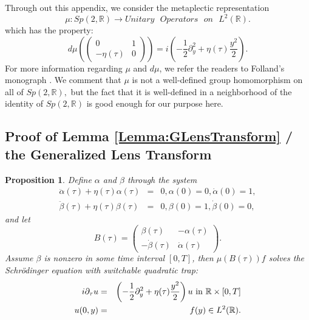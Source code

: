 \documentclass[reqno]{amsart}
\theoremstyle{plain}
\newtheorem{proposition}{Proposition}
\numberwithin{equation}{section}
\begin{document}
Through out this appendix, we consider the metaplectic representation\begin{equation*}
\mu :Sp\left( 2,\mathbb{R}\right) \rightarrow Unitary\text{ }Operators\text{ 
}on\text{ }L^{2}(\mathbb{R}).
\end{equation*}which has the property:\begin{equation*}
d\mu \left( 
\begin{pmatrix}
0 & 1 \\ 
-\eta (\tau ) & 0\end{pmatrix}\right) =i\left( -\frac{1}{2}\partial _{y}^{2}+\eta (\tau )\frac{y^{2}}{2}\right) .
\end{equation*}For more information regarding $\mu $ and $d\mu $, we refer the readers to
Folland's monograph \cite{Folland}. We comment that $\mu $ is not a
well-defined group homomorphism on all of $Sp\left( 2,\mathbb{R}\right) ,$
but the fact that it is well-defined in a neighborhood of the identity of $Sp\left( 2,\mathbb{R}\right) $ is good enough for our purpose here.

\subsection{Proof of Lemma \protect\ref{Lemma:GLensTransform} / the
Generalized Lens Transform}

\begin{proposition}
Define $\alpha $ and $\beta $ through the system\begin{eqnarray*}
\ddot{\alpha}(\tau )+\eta (\tau )\alpha (\tau ) &=&0,\alpha (0)=0,\dot{\alpha}(0)=1, \\
\ddot{\beta}(\tau )+\eta (\tau )\beta (\tau ) &=&0,\beta (0)=1,\dot{\beta}(0)=0,
\end{eqnarray*}and let 
\begin{equation*}
B(\tau )=\begin{pmatrix}
\beta (\tau ) & -\alpha (\tau ) \\ 
-\dot{\beta}(\tau ) & \dot{\alpha}(\tau )\end{pmatrix}.
\end{equation*}Assume $\beta $ is nonzero in some time interval $[0,T]$, then $\mu \left(
B\left( \tau \right) \right) f$ solves the Schr\"{o}dinger equation with
switchable quadratic trap:\begin{eqnarray}
i\partial _{\tau }u &=&\left( -\frac{1}{2}\partial _{y}^{2}+\eta (\tau )\frac{y^{2}}{2}\right) u\text{ in }\mathbb{R}\times \lbrack 0,T]
\label{eqn:the Schrodinger equation with switchable quadratic traps} \\
u(0,y) &=&f(y)\in L^{2}(\mathbb{R}).  \notag
\end{eqnarray}
\end{proposition}
\end{document}

